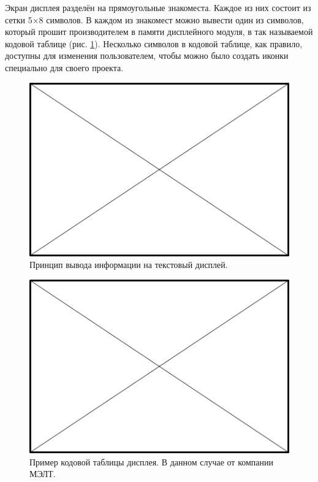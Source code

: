 Экран дисплея разделён на прямоугольные знакоместа. Каждое из них состоит из сетки 5×8 символов. В каждом из знакомест можно вывести один из символов, который прошит производителем в памяти дисплейного модуля, в так называемой кодовой таблице (рис. \ref{fig:text-lcd-code-page}). Несколько символов в кодовой таблице, как правило, доступны для изменения пользователем, чтобы можно было создать иконки специально для своего проекта.

\begin{figure}
  \centering
  \includegraphics{TODO}
  \caption{Принцип вывода информации на текстовый дисплей.}
\end{figure}

\begin{figure}
  \centering
  \includegraphics{TODO}
  \caption{Пример кодовой таблицы дисплея. В данном случае от компании МЭЛТ.}
  \label{fig:text-lcd-code-page}
\end{figure}

